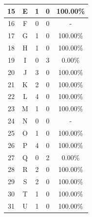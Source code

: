 \begin{longtable}[c]{|c|c|c|c|c|}
	15           & E                 & 1                       & 0                       &100.00\%            \\ \hline
	16           & F                 & 0                       & 0                       & -            \\ \hline
	17           & G                 & 1                       & 0                       &100.00\%            \\ \hline
	18           & H                 & 1                       & 0                       &100.00\%            \\ \hline
	19           & I                 & 0                       & 3                       &0.00\%            \\ \hline
	20           & J                 & 3                       & 0                       &100.00\%            \\ \hline
	21           & K                 & 2                       & 0                       &100.00\%            \\ \hline
	22           & L                 & 4                       & 0                       &100.00\%            \\ \hline
	23           & M                 & 1                       & 0                       &100.00\%            \\ \hline
	24           & N                 & 0                       & 0                       & -            \\ \hline
	25           & O                 & 1                       & 0                       &100.00\%            \\ \hline
	26           & P                 & 4                       & 0                       &100.00\%            \\ \hline
	27           & Q                 & 0                       & 2                       &0.00\%            \\ \hline
	28           & R                 & 2                       & 0                       &100.00\%            \\ \hline
	29           & S                 & 2                       & 0                       &100.00\%            \\ \hline
	30           & T                 & 1                       & 0                       &100.00\%            \\ \hline
	31           & U                 & 1                       & 0                       &100.00\%            \\ \hline

\end{longtable}

